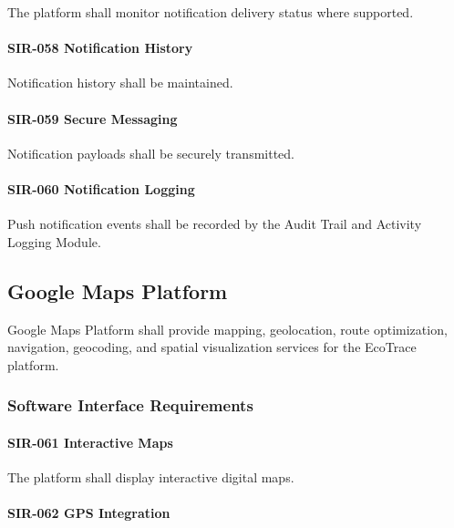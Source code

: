 The platform shall monitor notification delivery status where supported.

\paragraph{SIR-058 Notification History}

Notification history shall be maintained.

\paragraph{SIR-059 Secure Messaging}

Notification payloads shall be securely transmitted.

\paragraph{SIR-060 Notification Logging}

Push notification events shall be recorded by the Audit Trail and
Activity Logging Module.


\subsection{Google Maps Platform}

Google Maps Platform shall provide mapping, geolocation, route
optimization, navigation, geocoding, and spatial visualization services
for the EcoTrace platform.


\subsubsection*{Software Interface Requirements}

\paragraph{SIR-061 Interactive Maps}

The platform shall display interactive digital maps.

\paragraph{SIR-062 GPS Integration}

